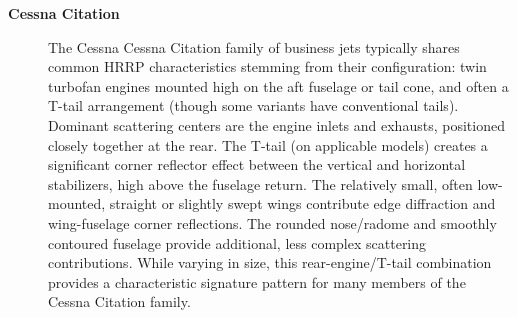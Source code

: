 {\begin{description}
    \item[\textbf{Cessna Citation}]
    The Cessna Cessna Citation family of business jets typically shares common HRRP characteristics stemming from their configuration: twin turbofan engines mounted high on the aft fuselage or tail cone, and often a T-tail arrangement (though some variants have conventional tails). Dominant scattering centers are the engine inlets and exhausts, positioned closely together at the rear. The T-tail (on applicable models) creates a significant corner reflector effect between the vertical and horizontal stabilizers, high above the fuselage return. The relatively small, often low-mounted, straight or slightly swept wings contribute edge diffraction and wing-fuselage corner reflections. The rounded nose/radome and smoothly contoured fuselage provide additional, less complex scattering contributions. While varying in size, this rear-engine/T-tail combination provides a characteristic signature pattern for many members of the Cessna Citation family.

\end{description}}

